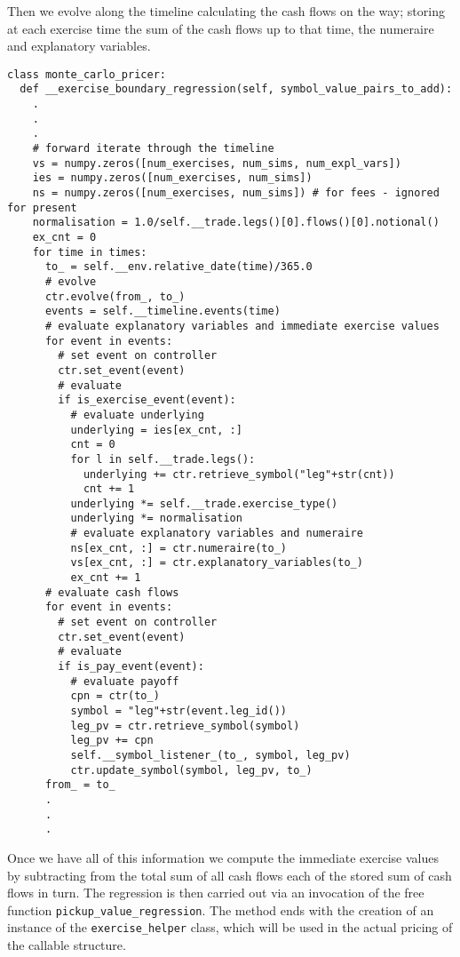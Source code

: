 Then we evolve along the timeline calculating the cash flows on the
way; storing at each exercise time the sum of the cash flows up to that
time, the numeraire and explanatory variables. 
\begin{verbatim}
class monte_carlo_pricer:
  def __exercise_boundary_regression(self, symbol_value_pairs_to_add):
    .
    .
    .
    # forward iterate through the timeline
    vs = numpy.zeros([num_exercises, num_sims, num_expl_vars])
    ies = numpy.zeros([num_exercises, num_sims])
    ns = numpy.zeros([num_exercises, num_sims]) # for fees - ignored for present
    normalisation = 1.0/self.__trade.legs()[0].flows()[0].notional()
    ex_cnt = 0
    for time in times:
      to_ = self.__env.relative_date(time)/365.0
      # evolve
      ctr.evolve(from_, to_)
      events = self.__timeline.events(time)
      # evaluate explanatory variables and immediate exercise values
      for event in events:
        # set event on controller
        ctr.set_event(event)
        # evaluate
        if is_exercise_event(event):
          # evaluate underlying  
          underlying = ies[ex_cnt, :]           
          cnt = 0
          for l in self.__trade.legs():
            underlying += ctr.retrieve_symbol("leg"+str(cnt))         
            cnt += 1   
          underlying *= self.__trade.exercise_type()       
          underlying *= normalisation
          # evaluate explanatory variables and numeraire
          ns[ex_cnt, :] = ctr.numeraire(to_)
          vs[ex_cnt, :] = ctr.explanatory_variables(to_)
          ex_cnt += 1
      # evaluate cash flows
      for event in events:
        # set event on controller
        ctr.set_event(event)
        # evaluate
        if is_pay_event(event):
          # evaluate payoff
          cpn = ctr(to_)
          symbol = "leg"+str(event.leg_id())
          leg_pv = ctr.retrieve_symbol(symbol) 
          leg_pv += cpn        
          self.__symbol_listener_(to_, symbol, leg_pv)
          ctr.update_symbol(symbol, leg_pv, to_)                      
      from_ = to_
      .
      .
      .
\end{verbatim}
Once we have all of
this information we compute the immediate exercise values by
subtracting from the total sum of all cash flows each of the stored
sum of cash flows in turn. The regression is then carried out via an
invocation of the free function \verb|pickup_value_regression|. The
method ends with the creation of an instance of the
\verb|exercise_helper| class, which will be used in the actual pricing
of the callable structure.
